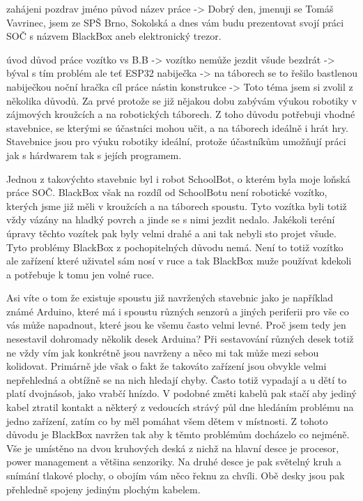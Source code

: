 zahájeni
{
    pozdrav
    jméno
    původ
    název práce
}-> Dobrý den, jmenuji se Tomáš Vavrinec, jsem ze SPŠ Brno, Sokolská
    a dnes vám budu prezentovat 
    svojí práci SOČ s názvem BlackBox aneb elektronický trezor. %

úvod
{
    důvod práce
        vozítko vs B.B  -> vozítko nemůže jezdit všude
        bezdrát         -> býval s tím problém ale teť ESP32
        nabiječka       -> na táborech se to řešilo bastlenou nabiječkou
        noční hračka
    cíl práce
    nástin konstrukce
}-> Toto téma jsem si zvolil z několika důvodů. Za prvé protože se již nějakou dobu zabývám 
    výukou robotiky v zájmových kroužcích a na robotických táborech. Z toho důvodu potřebuji 
    vhodné stavebnice, se kterými se účastníci mohou učit, a na táborech ideálně i hrát hry.
    Stavebnice jsou pro výuku robotiky ideální, protože účastníkům umožňují práci jak 
    s hárdwarem tak s jejích programem.

    Jednou z takovýchto stavebnic byl i robot SchoolBot, o kterém byla moje loňská práce SOČ.
    BlackBox však na rozdíl od SchoolBotu není robotické vozítko, kterých jsme již měli v kroužcích
    a na táborech spoustu. 
    Tyto vozítka byli totiž vždy vázány na hladký povrch a jinde se s nimi jezdit nedalo.
    Jakékoli teréní úpravy těchto vozítek pak byly velmi drahé a ani tak nebyli sto projet všude.
    Tyto problémy BlackBox z pochopitelných důvodu nemá. Není to totiž vozítko ale zařízení které uživatel
    sám nosí v ruce a tak BlackBox muže používat kdekoli a potřebuje k tomu jen volné ruce.
    
    Asi víte o tom že existuje spoustu již navržených stavebnic jako je například známé Arduino, 
    které má i spoustu různých senzorů a jiných periferii pro vše co vás může napadnout, které jsou ke všemu 
    často velmi levné. 
    Proč jsem tedy jen nesestavil dohromady několik desek Arduina? Při sestavování různých desek
    totiž ne vždy vím jak konkrétně jsou navrženy a něco mi tak může mezi sebou kolidovat.
    Primárně jde však o fakt že takováto zařízení jsou obvykle velmi nepřehledná a obtížně 
    se na nich hledají chyby. Často totiž vypadají a u dětí to platí dvojnásob, jako vrabčí hnízdo.
    V podobné změti kabelů pak stačí aby jediný kabel ztratil kontakt a některý z vedoucích 
    strávý půl dne hledáním problému na jedno zařízení, zatím co by měl pomáhat všem dětem v místnosti.
    Z tohoto důvodu je BlackBox navržen tak aby k těmto problémům docházelo co nejméně. 
    Vše je umístěno na dvou kruhových deská z nichž na hlavní desce je procesor, power management a většina
    senzoriky. Na druhé desce je pak světelný kruh a snímání tlakové plochy, o obojím vám něco řeknu za chvíli.
    Obě desky jsou pak přehledně spojeny jediným plochým kabelem.


